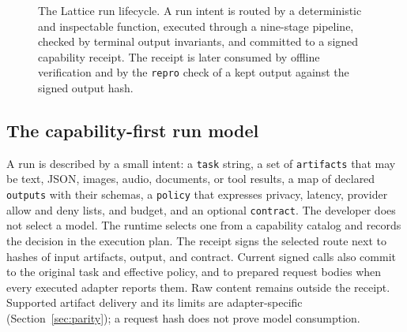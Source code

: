 \documentclass[conference]{IEEEtran}
\newcommand{\code}[1]{\texttt{\small #1}}
\begin{document}
\begin{figure}[t]
\centering
{}
\caption{The Lattice run lifecycle. A run intent is routed by a deterministic and
inspectable function, executed through a nine-stage pipeline, checked by terminal
output invariants, and committed to a signed capability receipt. The receipt is later
consumed by offline verification and by the \code{repro} check of a kept output
against the signed output hash.}
\label{fig:arch}
\end{figure}

\subsection{The capability-first run model}

A run is described by a small intent: a \code{task} string, a set of \code{artifacts}
that may be text, JSON, images, audio, documents, or tool results, a map of declared
\code{outputs} with their schemas, a \code{policy} that expresses privacy, latency,
provider allow and deny lists, and budget, and an optional \code{contract}. The
developer does not select a model. The runtime selects one from a capability catalog
and records the decision in the execution plan. The receipt signs the selected route
next to hashes of input artifacts, output, and contract. Current signed calls also
commit to the original task and effective policy, and to prepared request bodies when
every executed adapter reports them. Raw content remains outside the receipt.
Supported artifact delivery and its limits are adapter-specific
(Section~\ref{sec:parity}); a request hash does not prove model consumption.
\end{document}
